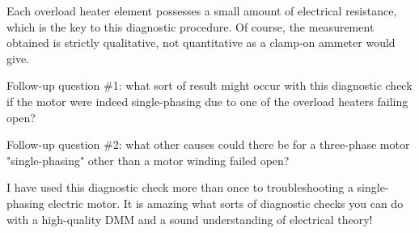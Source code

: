 
Each overload heater element possesses a small amount of electrical resistance, which is the key to this diagnostic procedure.  Of course, the measurement obtained is strictly qualitative, not quantitative as a clamp-on ammeter would give.

\vskip 10pt

Follow-up question \#1: what sort of result might occur with this diagnostic check if the motor were indeed single-phasing due to one of the overload heaters failing open?

\vskip 10pt

Follow-up question \#2: what other causes could there be for a three-phase motor "single-phasing" other than a motor winding failed open?







I have used this diagnostic check more than once to troubleshooting a single-phasing electric motor.  It is amazing what sorts of diagnostic checks you can do with a high-quality DMM and a sound understanding of electrical theory!




